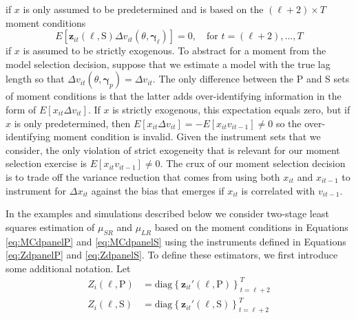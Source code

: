 if $x$ is only assumed to be predetermined and is based on the $(\ell + 2)\times T$ moment conditions 
\begin{equation}
  E\left[ \mathbf{z}_{it}(\ell,\mbox{S})\Delta v_{it}(\theta, \boldsymbol{\gamma}_\ell) \right] = 0, \quad \mbox{for } t = (\ell + 2),\dots, T 
  \label{eq:MCdpanelS}
\end{equation}
if $x$ is assumed to be strictly exogenous.
To abstract for a moment from the model selection decision, suppose that we estimate a model with the true lag length so that $\Delta v_{it}(\theta, \boldsymbol{\gamma}_p) = \Delta v_{it}$.
The only difference between the P and S sets of moment conditions is that the latter adds over-identifying information in the form of $E[x_{it}\Delta v_{it}]$.
If $x$ is strictly exogenous, this expectation equals zero, but if $x$ is only predetermined, then $E[x_{it}\Delta v_{it}] = -E[x_{it}v_{it-1}] \neq 0$ so the over-identifying moment condition is invalid.
Given the instrument sets that we consider, the only violation of strict exogeneity that is relevant for our moment selection exercise is $E[x_{it}v_{it-1}]\neq 0$.
The crux of our moment selection decision is to trade off the variance reduction that comes from using both $x_{it}$ and $x_{it-1}$ to instrument for $\Delta x_{it}$ against the bias that emerges if $x_{it}$ is correlated with $v_{it-1}$.

In the examples and simulations described below we consider two-stage least squares estimation of $\mu_{SR}$ and $\mu_{LR}$ based on the moment conditions in Equations \ref{eq:MCdpanelP} and \ref{eq:MCdpanelS} using the instruments defined in Equations \ref{eq:ZdpanelP} and \ref{eq:ZdpanelS}.
To define these estimators, we first introduce some additional notation.
Let
\begin{align}
Z_i(\ell,\mbox{P}) &= \mbox{diag}\left\{ \mathbf{z}_{it}'(\ell,\mbox{P}) \right\}_{t=\ell+2}^T
  \label{eq:dpanelZPiDef}\\
  Z_i(\ell,\mbox{S}) &= \mbox{diag}\left\{ \mathbf{z}_{it}'(\ell,\mbox{S}) \right\}_{t=\ell+2}^T
  \label{eq:dpanelZSiDef}
\end{align}

